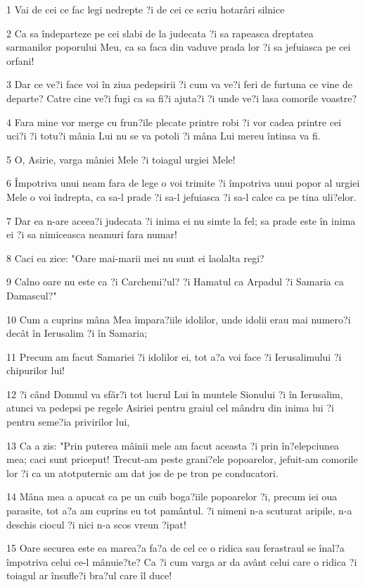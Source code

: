\par 1 Vai de cei ce fac legi nedrepte ?i de cei ce scriu hotarâri silnice
\par 2 Ca sa îndeparteze pe cei slabi de la judecata ?i sa rapeasca dreptatea sarmanilor poporului Meu, ca sa faca din vaduve prada lor ?i sa jefuiasca pe cei orfani!
\par 3 Dar ce ve?i face voi în ziua pedepsirii ?i cum va ve?i feri de furtuna ce vine de departe? Catre cine ve?i fugi ca sa fi?i ajuta?i ?i unde ve?i lasa comorile voastre?
\par 4 Fara mine vor merge cu frun?ile plecate printre robi ?i vor cadea printre cei uci?i ?i totu?i mânia Lui nu se va potoli ?i mâna Lui mereu întinsa va fi.
\par 5 O, Asirie, varga mâniei Mele ?i toiagul urgiei Mele!
\par 6 Împotriva unui neam fara de lege o voi trimite ?i împotriva unui popor al urgiei Mele o voi îndrepta, ca sa-l prade ?i sa-l jefuiasca ?i sa-l calce ca pe tina uli?elor.
\par 7 Dar ea n-are aceea?i judecata ?i inima ei nu simte la fel; sa prade este în inima ei ?i sa nimiceasca neamuri fara numar!
\par 8 Caci ea zice: "Oare mai-marii mei nu sunt ei laolalta regi?
\par 9 Calno oare nu este ca ?i Carchemi?ul? ?i Hamatul ca Arpadul ?i Samaria ca Damascul?"
\par 10 Cum a cuprins mâna Mea împara?iile idolilor, unde idolii erau mai numero?i decât în Ierusalim ?i în Samaria;
\par 11 Precum am facut Samariei ?i idolilor ei, tot a?a voi face ?i Ierusalimului ?i chipurilor lui!
\par 12 ?i când Domnul va sfâr?i tot lucrul Lui în muntele Sionului ?i în Ierusalim, atunci va pedepsi pe regele Asiriei pentru graiul cel mândru din inima lui ?i pentru seme?ia privirilor lui,
\par 13 Ca a zis: "Prin puterea mâinii mele am facut aceasta ?i prin în?elepciunea mea; caci sunt priceput! Trecut-am peste grani?ele popoarelor, jefuit-am comorile lor ?i ca un atotputernic am dat jos de pe tron pe conducatori.
\par 14 Mâna mea a apucat ca pe un cuib boga?iile popoarelor ?i, precum iei oua parasite, tot a?a am cuprins eu tot pamântul. ?i nimeni n-a scuturat aripile, n-a deschis ciocul ?i nici n-a scos vreun ?ipat!
\par 15 Oare securea este ea marea?a fa?a de cel ce o ridica sau ferastraul se înal?a împotriva celui ce-l mânuie?te? Ca ?i cum varga ar da avânt celui care o ridica ?i toiagul ar însufle?i bra?ul care îl duce!
